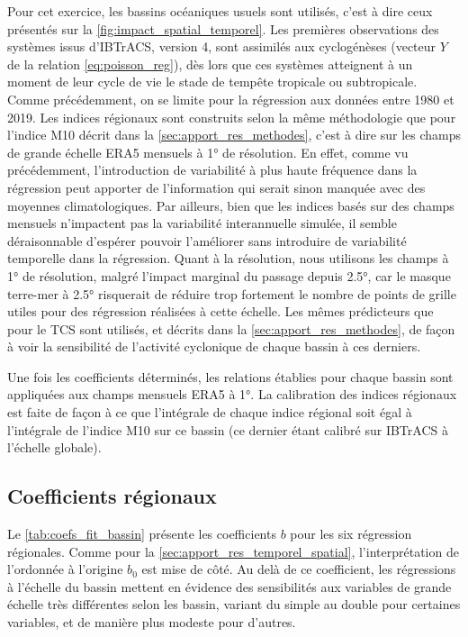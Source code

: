 \documentclass[../main.tex]{subfiles}
\begin{document}
Pour cet exercice, les bassins océaniques usuels sont utilisés, c'est à dire ceux présentés sur la \cref{fig:impact_spatial_temporel}. Les premières
observations des systèmes issus d'IBTrACS, version 4, sont assimilés aux cyclogénèses (vecteur $Y$ de la relation \ref{eq:poisson_reg}), dès lors que ces
systèmes atteignent à un moment de leur cycle de vie le stade de tempête tropicale ou subtropicale. Comme précédemment, on se limite pour la régression aux
données entre \num{1980} et \num{2019}. Les indices régionaux sont construits selon la même méthodologie que pour l'indice M10 décrit dans la
\cref{sec:apport_res_methodes}, c'est à dire sur les champs de grande échelle ERA5 mensuels à \ang{1} de résolution. En effet, comme vu précédemment,
l'introduction de variabilité à plus haute fréquence dans la régression peut apporter de l'information qui serait sinon manquée avec des moyennes
climatologiques. Par ailleurs, bien que les indices basés sur des champs mensuels n'impactent pas la variabilité interannuelle simulée, il semble déraisonnable
d'espérer pouvoir l'améliorer sans introduire de variabilité temporelle dans la régression. Quant à la résolution, nous utilisons les champs à \ang{1} de
résolution, malgré l'impact marginal du passage depuis \ang{2.5}, car le masque terre-mer à \ang{2.5} risquerait de réduire trop fortement le nombre de points
de grille utiles pour des régression réalisées à cette échelle. Les mêmes prédicteurs que pour le TCS sont utilisés, et décrits dans la
\cref{sec:apport_res_methodes}, de façon à voir la sensibilité de l'activité cyclonique de chaque bassin à ces derniers.

Une fois les coefficients déterminés, les relations établies pour chaque bassin sont appliquées aux champs mensuels ERA5 à \ang{1}. La calibration des indices
régionaux est faite de façon à ce que l'intégrale de chaque indice régional soit égal à l'intégrale de l'indice M10 sur ce bassin (ce dernier étant calibré sur
IBTrACS à l'échelle globale).


\subsection{Coefficients régionaux}\label{sec:lm10_coefficients}

Le \cref{tab:coefs_fit_bassin} présente les coefficients $b$ pour les six régression régionales. Comme pour la \cref{sec:apport_res_temporel_spatial},
l'interprétation de l'ordonnée à l'origine $b_0$ est mise de côté. Au delà de ce coefficient, les régressions à l'échelle du bassin mettent en évidence des
sensibilités aux variables de grande échelle très différentes selon les bassin, variant du simple au double pour certaines variables, et de manière plus modeste
pour d'autres.
\end{document}
